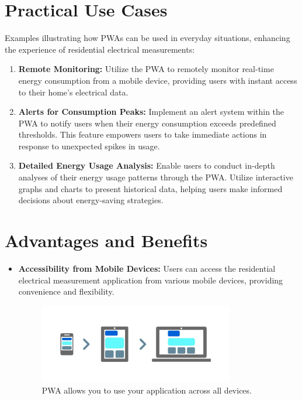 \documentclass{article}
\begin{document}
\begin{multicols}{2}
\section*{Practical Use Cases}
Examples illustrating how PWAs can be used in everyday situations, enhancing the experience of residential electrical measurements:

\begin{enumerate}
    \item \textbf{Remote Monitoring:} Utilize the PWA to remotely monitor real-time energy consumption from a mobile device, providing users with instant access to their home's electrical data.
    
    \item \textbf{Alerts for Consumption Peaks:} Implement an alert system within the PWA to notify users when their energy consumption exceeds predefined thresholds. This feature empowers users to take immediate actions in response to unexpected spikes in usage.
    
    \item \textbf{Detailed Energy Usage Analysis:} Enable users to conduct in-depth analyses of their energy usage patterns through the PWA. Utilize interactive graphs and charts to present historical data, helping users make informed decisions about energy-saving strategies.
\end{enumerate}

\section*{Advantages and Benefits}
\begin{itemize}
    \item \textbf{Accessibility from Mobile Devices:} Users can access the residential electrical measurement application from various mobile devices, providing convenience and flexibility.
    
    \begin{figure}
        \centering
        \includegraphics[width=0.8\textwidth]{images/mobile-first.jpg}  %
        \caption{PWA allows you to use your application across all devices.}
    \end{figure}


\end{itemize}
\end{multicols}
\end{document}
